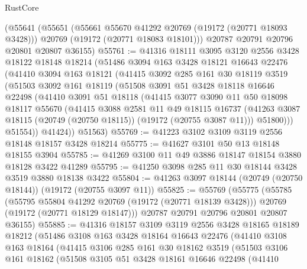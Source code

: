 \begin{lexlean}{RustCore}
\begin{coremodule}
    (@55641
      (@55651
        (@55661 @55670 @41292 @20769 (@19172 (@20771 @18093 @3428)))
        @20769
        (@19172 (@20771 @18083 @18101)))
      @20787
      @20791
      @20796
      @20801
      @20807
      @36155)
@55761 := @41316
    @18111
    @3095
    @3120
    @2556
    @3428
    @18122
    @18148
    @18214
    (@51486
      @3094
      @163
      @3428
      @18121
      @16643
      @22476
      (@41410
        @3094
        @163
        @18121
        (@41415
          @3092
          @285
          @161
          @30
          @18119
          @3519
          (@51503
            @3092
            @161
            @18119
            (@51508
              @3091
              @51
              @3428
              @18118
              @16646
              @22498
              (@41410
                @3091
                @51
                @18118
                (@41415
                  @3077
                  @3090
                  @11
                  @50
                  @18098
                  @18117
                  @55670
                  (@41415
                    @3088
                    @2581
                    @11
                    @49
                    @18115
                    @16737
                    (@41263 @3087 @18115 (@20749 (@20750 @18115)) (@19172 (@20755 @3087 @11)))
                    @51800)))
              @51554))
          @41424))
      @51563)
@55769 := @41223 @3102 @3109 @3119 @2556 @18148 @18157 @3428 @18214
@55775 := @41627 @3101 @50 @13 @18148 @18155 @3904
@55785 := @41269 @3100 @11 @49 @3886 @18147 @18154 @3880 @18128 @3422 @41289
@55795 := @41250 @3098 @285 @11 @30 @18144 @3428 @3519 @3880 @18138 @3422
@55804 := @41263 @3097 @18144 (@20749 (@20750 @18144)) (@19172 (@20755 @3097 @11))
@55825 := @55769
    (@55775
      (@55785
        (@55795 @55804 @41292 @20769 (@19172 (@20771 @18139 @3428)))
        @20769
        (@19172 (@20771 @18129 @18147)))
      @20787
      @20791
      @20796
      @20801
      @20807
      @36155)
@55885 := @41316
    @18157
    @3109
    @3119
    @2556
    @3428
    @18165
    @18189
    @18212
    (@51486
      @3108
      @163
      @3428
      @18164
      @16643
      @22476
      (@41410
        @3108
        @163
        @18164
        (@41415
          @3106
          @285
          @161
          @30
          @18162
          @3519
          (@51503
            @3106
            @161
            @18162
            (@51508
              @3105
              @51
              @3428
              @18161
              @16646
              @22498
              (@41410

\end{coremodule}
\end{lexlean}
